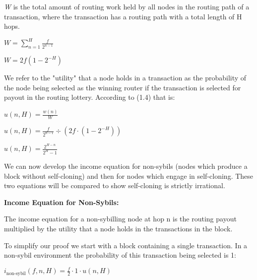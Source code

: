 \documentclass[oneside]{article}   	%
\begin{document}
\begin{multicols}{2}
\textit{W} is the total amount of routing work held by all nodes in the routing path of a transaction, where the transaction has a routing path with a total length of H hops.

\large
\begin{adjustwidth}{1.5em}{1.5em} 
	\begin{math}
	W = \sum_{n=1}^{H} \frac{f}{2^{n-1}}
	\end{math}

	\begin{math}
	W = 2f\left(1-2^{-H}\right)
	\end{math}
\end{adjustwidth}
\normalsize

We refer to the "utility" that a node holds in a transaction as the probability of the node being selected as the winning router if the transaction is selected for payout in the routing lottery. According to (1.4) that is:

\large
\begin{adjustwidth}{1.5em}{1.5em} 
	\begin{math}
	u(n, H) = \frac{w(n)}{W}
	\end{math}

	\begin{math}
	u(n, H) = \frac{f}{2^{n-1}} \div \left(2f \cdot \left(1-2^{-H}\right)\right)
	\end{math}

	\begin{math}
	u(n, H) = \frac{2^{H - n}}{2^H - 1}
	\end{math}
\end{adjustwidth}
\normalsize

We can now develop the income equation for non-sybils (nodes which produce a block without self-cloning) and then for nodes which engage in self-cloning. These two equations will be compared to show self-cloning is strictly irrational.

\textbf{Income Equation for Non-Sybils:}

The income equation for a non-sybilling node at hop n is the routing payout multiplied by the utility that a node holds in the transactions in the block.

To simplify our proof we start with a block containing a single transaction. In a non-sybil environment the probability of this transaction being selected is 1:

\large
\begin{adjustwidth}{1.5em}{1.5em} 
	\begin{math}
i_{\text{non-sybil}}(f, n, H) = \frac{f}{2} \cdot 1 \cdot u(n, H)
	\end{math}


\end{adjustwidth}
\end{multicols}
\end{document}
